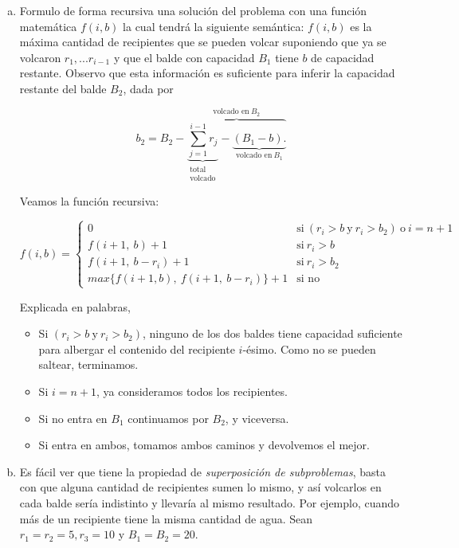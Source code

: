 \documentclass[12pt, a4paper]{report}
\theoremstyle{definition} %
\begin{document}
\begin{enumerate}[a)]
    \item Formulo de forma recursiva una solución del problema con una función matemática $f(i, b)$ la cual tendrá la siguiente semántica: $f(i, b)$ es la máxima cantidad de recipientes que se pueden volcar suponiendo que ya se volcaron $r_1, ... r_{i-1}$ y que el balde con capacidad $B_1$ tiene $b$ de capacidad restante. Observo que esta información es suficiente para inferir la capacidad restante del balde $B_2$, dada por 
    
    \[ 
        b_2 = B_2 -
            \overbrace{
            \underbrace{\sum_{j=1}^{i-1} r_j}_{\substack{\text{total}\\\text{volcado}}} - 
            \underbrace{(B_1 - b).}_{\text{volcado en} \ B_1}
            }^{\text{volcado en} \ B_2}
    \]

    Veamos la función recursiva:

    \[ 
        f(i, b) =
            \begin{cases}
                0 & \text{si} \ (r_i > b \ \text{y}\  r_i > b_2) \ \text{o} \ i = n+1 \\
                f(i+1,\ b) + 1 &\text{si}\ r_i > b\\
                f(i+1,\ b - r_i) + 1 &\text{si}\ r_i > b_2\\
                max\{f(i+1, b),\ f(i+1,\ b - r_i)\} + 1 &\text{si no}
            \end{cases}
    \]

    Explicada en palabras,

    \begin{itemize}
        \item Si $(r_i > b \ \text{y}\  r_i > b_2)$, ninguno de los dos baldes tiene capacidad suficiente para albergar el contenido del recipiente $i$-ésimo. Como no se pueden saltear, terminamos.
        \item Si $i = n + 1$, ya consideramos todos los recipientes.
        \item Si no entra en $B_1$ continuamos por $B_2$, y viceversa.
        \item Si entra en ambos, tomamos ambos caminos y devolvemos el mejor.
    \end{itemize}

    \item Es fácil ver que tiene la propiedad de \textit{superposición de subproblemas}, basta con que alguna cantidad de recipientes sumen lo mismo, y así volcarlos en cada balde sería indistinto y llevaría al mismo resultado. Por ejemplo, cuando más de un recipiente tiene la misma cantidad de agua. Sean $r_1 = r_2 = 5, r_3 = 10$ y $B_1 = B_2 = 20$.
    

\end{enumerate}
\end{document}
